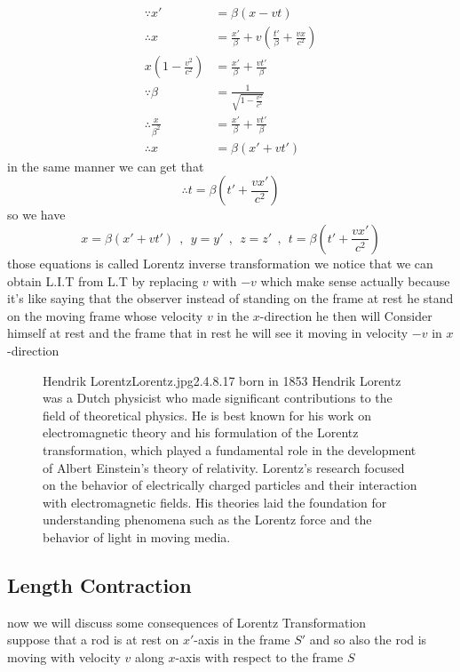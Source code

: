 \documentclass{article}
\begin{document}
\begin{align*}
    \because x' &= \beta(x-vt)\\
    \therefore x &= \frac{x'}{\beta} + v\left(\frac{t'}{\beta} + \frac{vx}{c^2}\right)\\
    x\left(1-\frac{v^2}{c^2}\right) &= \frac{x'}{\beta} + \frac{vt'}{\beta}    \\
    \because \beta &= \frac{1}{\sqrt{1-\frac{v^2}{c^2}}}\\
    \therefore \frac{x}{\beta^2} &= \frac{x'}{\beta} + \frac{vt'}{\beta}    \\
    \therefore x &= \beta(x'+vt')
\end{align*}
in the same manner we can get that 
\[
\therefore t =\beta\left(t' + \frac{vx'}{c^2}\right)
\]
so we have 
\[
        x= \beta(x'+vt')
        \ \ , \ \ 
        y = y'
        \ \ , \ \ 
        z = z'
        \ \ , \ \
        t =\beta\left(t' + \frac{vx'}{c^2}\right)
\]
those equations is called Lorentz inverse transformation
we notice that we can obtain L.I.T from L.T by replacing $v$ with $-v$
which make sense actually because it's like saying that the observer instead of standing on the frame at rest he stand on the moving frame whose velocity $v$ in the $x$-direction he then will Consider himself at rest and the frame that in rest he will see it moving in velocity $-v$ in $x$-direction
\begin{figure}[b]
    \begin{enrichment}{Hendrik Lorentz}{Lorentz.jpg}{2.4}{.8}{.17}
    born in 1853 Hendrik Lorentz was a Dutch physicist who made significant contributions to the field of theoretical physics.
    He is best known for his work on electromagnetic theory and his formulation of the Lorentz transformation, which played a fundamental role in the development of Albert Einstein's theory of relativity. 
    Lorentz's research focused on the behavior of electrically charged particles and their interaction with electromagnetic fields. 
    His theories laid the foundation for understanding phenomena such as the Lorentz force and the behavior of light in moving media.
    \end{enrichment}
\end{figure}

\pagebreak 
\subsection{Length Contraction}
now we will discuss some consequences of Lorentz Transformation \\
suppose that a rod is at rest on $x'$-axis in the frame $S'$ and so also the rod is moving with velocity $v$ along $x$-axis with respect to the frame $S$
\end{document}
